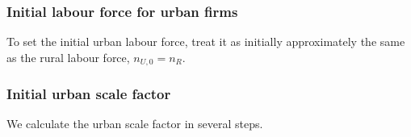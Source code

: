 \subsubsection{Initial labour force for urban firms}
To set the initial urban labour force, treat it as initially approximately the same as the rural labour force,  $n_{U,0}=n_R$. %




\subsubsection{Initial urban scale factor}


We calculate the urban scale factor in several steps.

